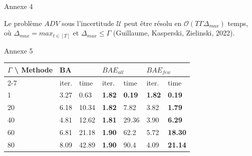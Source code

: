 \documentclass[10pt]{beamer}
\begin{document}
\begin{frame}{Annexe 4}
	\begin{theorem}
		Le problème $ADV$ sous l'incertitude $\mathcal{U}$ peut être résolu en $\mathcal{O}(T\Gamma\Delta_{max})$ temps, où $\Delta_{max}=max_{t\in[T]}$ et $\Delta_{max} \leq\Gamma$ (Guillaume, Kasperski, Zielinski, 2022).\cite{GOERIGK2023108941}
	\end{theorem}
\end{frame}

\begin{frame}{Annexe 5}
	\begin{table}[]
        \centering
        \begin{tabular}{@{}|l|llllll@{}}
        \toprule
        \multirow{2}{*}{$\Gamma$ \textbackslash{} Methode} & \multicolumn{2}{l|}{BA}                                & \multicolumn{2}{l|}{$BAE_{all}$}                              & \multicolumn{2}{l|}{$BAE_{few}$}                              \\ \cmidrule(l){2-7} 
                                                      & iter.                     & time                       & iter.                     & time                       & iter.                     & time                       \\ \midrule
        1                                             & \multicolumn{1}{l|}{3.27} & \multicolumn{1}{l|}{0.63}  & \multicolumn{1}{l|}{\textbf{1.82}} & \multicolumn{1}{l|}{\textbf{0.19}}  & \multicolumn{1}{l|}{\textbf{1.82}} & \multicolumn{1}{l|}{\textbf{0.19}}  \\ \midrule
        20                                            & \multicolumn{1}{l|}{6.18} & \multicolumn{1}{l|}{10.34} & \multicolumn{1}{l|}{\textbf{1.82}} & \multicolumn{1}{l|}{7.82}  & \multicolumn{1}{l|}{3.82} & \multicolumn{1}{l|}{\textbf{1.79}}  \\ \midrule
        40                                            & \multicolumn{1}{l|}{4.81} & \multicolumn{1}{l|}{12.62} & \multicolumn{1}{l|}{\textbf{1.81}} & \multicolumn{1}{l|}{29.36} & \multicolumn{1}{l|}{3.90} & \multicolumn{1}{l|}{\textbf{6.29}}  \\ \midrule
        60                                            & \multicolumn{1}{l|}{6.81} & \multicolumn{1}{l|}{21.18} & \multicolumn{1}{l|}{\textbf{1.90}} & \multicolumn{1}{l|}{62.2}  & \multicolumn{1}{l|}{5.72} & \multicolumn{1}{l|}{\textbf{18.30}} \\ \midrule
        80                                            & \multicolumn{1}{l|}{8.09} & \multicolumn{1}{l|}{42.89} & \multicolumn{1}{l|}{\textbf{1.90}} & \multicolumn{1}{l|}{90.4}  & \multicolumn{1}{l|}{4.09} & \multicolumn{1}{l|}{\textbf{21.14}} \\ \midrule

\end{tabular}
\end{table}
\end{frame}
\end{document}
